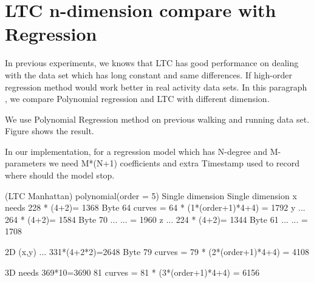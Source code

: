 \documentclass{report}
\begin{document}
\section{LTC n-dimension compare with Regression}
In previous experiments, we knows that LTC has good performance on dealing with the data set which has long constant and same differences. If high-order regression method would work better in real activity data sets. In this paragraph
, we compare Polynomial regression and LTC with different dimension. 


We use Polynomial Regression method on previous walking and running data set. Figure  shows the result.

In our implementation, for a regression model which has N-degree and M-parameters we need M*(N+1) coefficients and extra Timestamp used to record where should the model stop.

(LTC Manhattan)                     polynomial(order = 5)
Single dimension                    Single dimension
x needs 228 * (4+2)= 1368 Byte     64 curves = 64 * (1*(order+1)*4+4) = 1792
y  ...  264 * (4+2)= 1584 Byte     70 ...    ...  = 1960
z  ...  224 * (4+2)= 1344 Byte     61 ...    ...  = 1708

2D
(x,y) ... 331*(4+2*2)=2648 Byte    79 curves = 79 * (2*(order+1)*4+4) = 4108

3D
     needs 369*10=3690             81 curves = 81 * (3*(order+1)*4+4) = 6156

%
%



\end{document}
